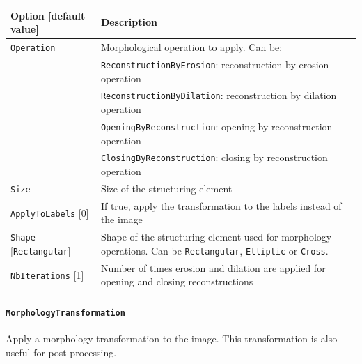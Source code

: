 \documentclass[a4paper,11pt,oneside]{article}
\newcommand{\iponly}{\reversemarginpar
    \marginnote{\color{listletiblue}\normalfont\scriptsize
    {\ttfamily{}\hyperref[sec:N2D2-IP]{\color{listletiblue}N2D2 IP}} \emph{only}}}
\begin{document}
\begin{center}
 \begin{tabular}{| p{5cm} | p{10cm} | }
 \hline
 Option [default value] & Description\\
 \hline\hline
  \cellcolor{requiredcolor}\lstinline!Operation! & Morphological operation to
  apply. Can be:\\
   & \lstinline!ReconstructionByErosion!: reconstruction by erosion operation \\
   & \lstinline!ReconstructionByDilation!: reconstruction by dilation
   operation \\
   & \lstinline!OpeningByReconstruction!: opening by reconstruction operation \\
   & \lstinline!ClosingByReconstruction!: closing by reconstruction operation \\
  \cellcolor{requiredcolor}\lstinline!Size! & Size of the structuring element \\
  \lstinline!ApplyToLabels! [0] & If true, apply the transformation to the
  labels instead of the image \\
  \lstinline!Shape! [\lstinline!Rectangular!] & Shape of the structuring element
   used for morphology operations. Can be \lstinline!Rectangular!,
   \lstinline!Elliptic! or \lstinline!Cross!. \\
  \lstinline!NbIterations! [1] & Number of times erosion and dilation are
  applied for opening and closing reconstructions \\
 \hline
\end{tabular}
\end{center}


\paragraph{\texorpdfstring{\lstinline[basicstyle=\ttfamily\bfseries]!MorphologyTransformation!\protect\iponly}
{MorphologyTransformation}}
Apply a morphology transformation to the image.
This transformation is also useful for post-processing.
\end{document}
